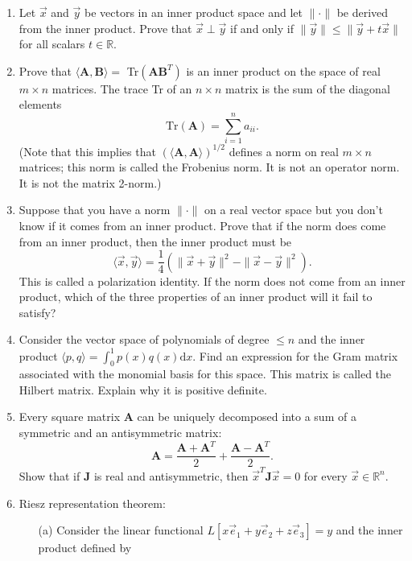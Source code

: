 \documentclass[11pt,fleqn]{article}
\begin{document}
\begin{enumerate}
\item Let $\vec{x}$ and $\vec{y}$ be vectors in an inner product space and let $\|\cdot\|$ be derived from the inner product. Prove that $\vec{x}\perp\vec{y}$ if and only if $\|\vec{y}\|\le\|\vec{y}+t\vec{x}\|$ for all scalars $t\in\mathbb{R}$.
\item Prove that $\langle\mathbf{A},\mathbf{B}\rangle=$ Tr$\left(\mathbf{AB}^T\right)$ is an inner product on the space of real $m\times n$ matrices. The trace Tr of an $n\times n$ matrix is the sum of the diagonal elements
\[\text{Tr}(\mathbf{A}) = \sum_{i=1}^na_{ii}.\]
(Note that this implies that $(\langle\mathbf{A},\mathbf{A}\rangle)^{1/2}$ defines a norm on real $m\times n$ matrices; this norm is called the Frobenius norm. It is not an operator norm. It is not the matrix 2-norm.)
\item Suppose that you have a norm $\|\cdot\|$ on a real vector space but you don't know if it comes from an inner product.
Prove that if the norm does come from an inner product, then the inner product must be
	\[\langle\vec{x},\vec{y}\rangle = \frac{1}{4}\left(\|\vec{x}+\vec{y}\|^2-\|\vec{x}-\vec{y}\|^2\right).\] This is called a polarization identity. If the norm does not come from an inner product, which of the three properties of an inner product will it fail to satisfy?
\item Consider the vector space of polynomials of degree $\le n$ and the inner product $\langle p,q\rangle = \int_0^1 p(x)q(x)\mathrm{d}x$. Find an expression for the Gram matrix associated with the monomial basis for this space. This matrix is called the Hilbert matrix. Explain why it is positive definite.
\item Every square matrix $\mathbf{A}$ can be uniquely decomposed into a sum of a symmetric and an antisymmetric matrix:
\[\mathbf{A} = \frac{\mathbf{A}+\mathbf{A}^T}{2} + \frac{\mathbf{A} - \mathbf{A}^T}{2}.\]
Show that if $\mathbf{J}$ is real and antisymmetric, then $\vec{x}^T\mathbf{J}\vec{x} = 0$ for every $\vec{x}\in\mathbb{R}^n$.
\item Riesz representation theorem:
	\begin{itemize}
	\item[(a)] Consider the linear functional $L[x\vec{e}_1+y\vec{e}_2+z\vec{e}_3] = y$ and the inner product defined by

\end{itemize}
\end{enumerate}
\end{document}
